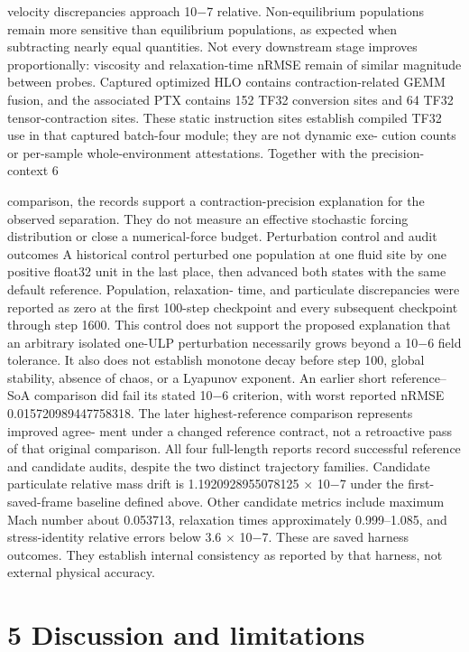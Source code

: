 \documentclass[11pt]{article}
\begin{document}
velocity discrepancies approach 10\ensuremath{-}7 relative. Non-equilibrium populations remain more sensitive
than equilibrium populations, as expected when subtracting nearly equal quantities. Not every
downstream stage improves proportionally: viscosity and relaxation-time nRMSE remain of similar
magnitude between probes.
Captured optimized HLO contains contraction-related GEMM fusion, and the associated PTX
contains 152 TF32 conversion sites and 64 TF32 tensor-contraction sites. These static instruction
sites establish compiled TF32 use in that captured batch-four module; they are not dynamic exe-
cution counts or per-sample whole-environment attestations. Together with the precision-context
6

comparison, the records support a contraction-precision explanation for the observed separation.
They do not measure an effective stochastic forcing distribution or close a numerical-force budget.
Perturbation control and audit outcomes
A historical control perturbed one population at one fluid site by one positive float32 unit in the
last place, then advanced both states with the same default reference. Population, relaxation-
time, and particulate discrepancies were reported as zero at the first 100-step checkpoint and every
subsequent checkpoint through step 1600. This control does not support the proposed explanation
that an arbitrary isolated one-ULP perturbation necessarily grows beyond a 10\ensuremath{-}6 field tolerance.
It also does not establish monotone decay before step 100, global stability, absence of chaos, or a
Lyapunov exponent.
An earlier short reference–SoA comparison did fail its stated 10\ensuremath{-}6 criterion, with worst reported
nRMSE 0.015720989447758318. The later highest-reference comparison represents improved agree-
ment under a changed reference contract, not a retroactive pass of that original comparison.
All four full-length reports record successful reference and candidate audits, despite the two
distinct trajectory families. Candidate particulate relative mass drift is 1.1920928955078125 \ensuremath{\times} 10\ensuremath{-}7
under the first-saved-frame baseline defined above. Other candidate metrics include maximum Mach
number about 0.053713, relaxation times approximately 0.999–1.085, and stress-identity relative
errors below 3.6 \ensuremath{\times} 10\ensuremath{-}7. These are saved harness outcomes. They establish internal consistency as
reported by that harness, not external physical accuracy.

\section*{5 Discussion and limitations}
\end{document}
